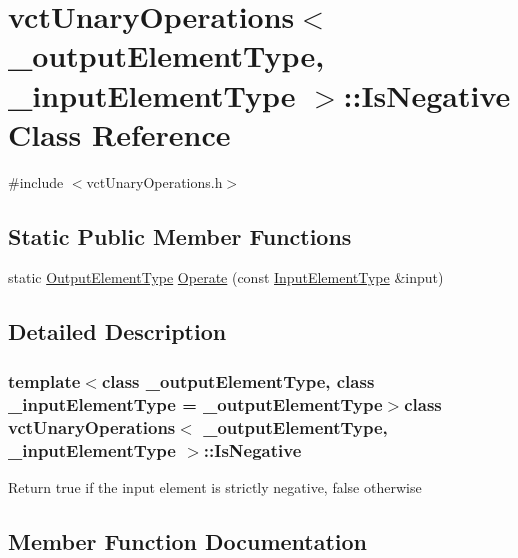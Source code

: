 \hypertarget{classvct_unary_operations_1_1_is_negative}{}\section{vct\+Unary\+Operations$<$ \+\_\+output\+Element\+Type, \+\_\+input\+Element\+Type $>$\+:\+:Is\+Negative Class Reference}
\label{classvct_unary_operations_1_1_is_negative}


{\ttfamily \#include $<$vct\+Unary\+Operations.\+h$>$}

\subsection*{Static Public Member Functions}
\begin{DoxyCompactItemize}
\item 
static \hyperlink{classvct_unary_operations_a42306ac3dd20d32c6d6c66ac3fa2e7b9}{Output\+Element\+Type} \hyperlink{classvct_unary_operations_1_1_is_negative_af6ddc1655b8db45edd9741ab05223175}{Operate} (const \hyperlink{classvct_unary_operations_abf3b77bb7b8abd7ba72a6a45a65696a7}{Input\+Element\+Type} \&input)
\end{DoxyCompactItemize}


\subsection{Detailed Description}
\subsubsection*{template$<$class \+\_\+output\+Element\+Type, class \+\_\+input\+Element\+Type = \+\_\+output\+Element\+Type$>$class vct\+Unary\+Operations$<$ \+\_\+output\+Element\+Type, \+\_\+input\+Element\+Type $>$\+::\+Is\+Negative}

Return true if the input element is strictly negative, false otherwise 

\subsection{Member Function Documentation}
\hypertarget{classvct_unary_operations_1_1_is_negative_af6ddc1655b8db45edd9741ab05223175}{}
